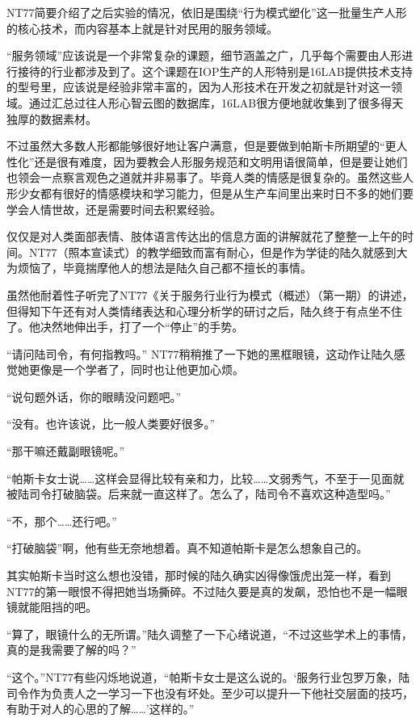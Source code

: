 NT77简要介绍了之后实验的情况，依旧是围绕“行为模式塑化”这一批量生产人形的核心技术，而内容基本上就是针对民用的服务领域。

“服务领域”应该说是一个非常复杂的课题，细节涵盖之广，几乎每个需要由人形进行接待的行业都涉及到了。这个课题在IOP生产的人形特别是16LAB提供技术支持的型号里，应该说是经验非常丰富的，因为人形技术在开发之初就是针对这一领域。通过汇总过往人形心智云图的数据库，16LAB很方便地就收集到了很多得天独厚的数据素材。

不过虽然大多数人形都能够很好地让客户满意，但是要做到帕斯卡所期望的“更人性化”还是很有难度，因为要教会人形服务规范和文明用语很简单，但是要让她们也领会一点察言观色之道就并非易事了。毕竟人类的情感是很复杂的。虽然这些人形少女都有很好的情感模块和学习能力，但是从生产车间里出来时日不多的她们要学会人情世故，还是需要时间去积累经验。

仅仅是对人类面部表情、肢体语言传达出的信息方面的讲解就花了整整一上午的时间。NT77（照本宣读式）的教学细致而富有耐心，但是作为学徒的陆久就感到大为烦恼了，毕竟揣摩他人的想法是陆久自己都不擅长的事情。

虽然他耐着性子听完了NT77《关于服务行业行为模式（概述）（第一期）的讲述，但得知下午还有对人类情绪表达和心理分析学的研讨之后，陆久终于有点坐不住了。他决然地伸出手，打了一个“停止”的手势。

“请问陆司令，有何指教吗。” NT77稍稍推了一下她的黑框眼镜，这动作让陆久感觉她更像是一个学者了，同时也让他更加心烦。

“说句题外话，你的眼睛没问题吧。”

“没有。也许该说，比一般人类要好很多。”

“那干嘛还戴副眼镜呢。”

“帕斯卡女士说……这样会显得比较有亲和力，比较……文弱秀气，不至于一见面就被陆司令打破脑袋。后来就一直这样了。怎么了，陆司令不喜欢这种造型吗。”

“不，那个……还行吧。”

“打破脑袋”啊，他有些无奈地想着。真不知道帕斯卡是怎么想象自己的。

其实帕斯卡当时这么想也没错，那时候的陆久确实凶得像饿虎出笼一样，看到NT77的第一眼恨不得把她当场撕碎。不过陆久要是真的发飙，恐怕也不是一幅眼镜就能阻挡的吧。

“算了，眼镜什么的无所谓。”陆久调整了一下心绪说道，“不过这些学术上的事情，真的是我需要了解的吗？”

“这个。”NT77有些闪烁地说道，“帕斯卡女士是这么说的。‘服务行业包罗万象，陆司令作为负责人之一学习一下也没有坏处。至少可以提升一下他社交层面的技巧，有助于对人的心思的了解……’这样的。”

